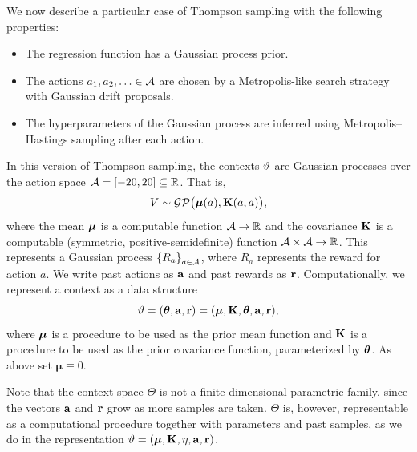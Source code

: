 \label{sec:math-spec}
We now describe a particular case of Thompson sampling with the following properties:
\begin{itemize}
  \item The regression function has a Gaussian process prior.
  \item The actions $a_1,a_2,\ldots \in \mathcal{A}$ are chosen by a Metropolis-like search
    strategy with Gaussian drift proposals.
  \item The hyperparameters of the Gaussian process are inferred using
    Metropolis--Hastings sampling after each action.
\end{itemize}

In this version of Thompson sampling, the contexts $\vartheta$ are Gaussian
processes over the action space $\mathcal{A} = [-20, 20] \subseteq \mathbb{R}$.  That is,
\[ V \sim \mathcal{GP}\big(\bm{\mu}(a), \mathbf{K}(a,a)\big), \]
where the mean $\bm{\mu}$ is a computable function $\mathcal{A} \to \mathbb{R}$ and the covariance
$\mathbf{K}$ is a computable (symmetric, positive-semidefinite) function $\mathcal{A} \times
\mathcal{A} \to \mathbb{R}$.  This represents a Gaussian process $\left\{ R_a \right\}_{a \in \mathcal{A}}$,
where $R_a$ represents the reward for action $a$. We write past actions as
$\mathbf{a}$ and past rewards as $\mathbf{r}$. Computationally, we represent
a context as a data structure
\[ \vartheta = (\bm{\theta}, \mathbf{a}, \mathbf{r}) = (\bm{\mu}, \mathbf{K},\bm{\theta}, \mathbf{a}, \mathbf{r}), \]
where $\bm{\mu}$ is a procedure to be used as the prior mean function and
$\mathbf{K}$ is a procedure to be used as the prior covariance function, parameterized by 
$\bm{\theta}$.
As above set $\bm{\mu} \equiv 0$.

Note that the context space $\Theta$ is not a finite-dimensional parametric
family, since the vectors $\mathbf{a}$ and $\mathbf{r}$ grow as more samples are
taken.  $\Theta$ is, however, representable as a computational
procedure together with parameters and past samples, as we do in the
representation $\vartheta = (\bm{\mu}, \mathbf{K}, \eta, \mathbf{a}, \mathbf{r})$.

